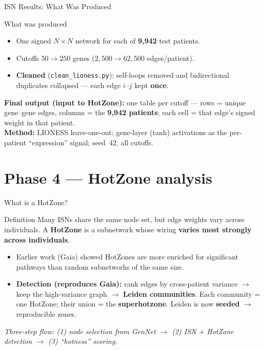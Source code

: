 \documentclass[aspectratio=169]{beamer}
\begin{document}
\begin{frame}{ISN Results: What Was Produced}
    \small
    \begin{block}{What was produced}
        \footnotesize
        \begin{itemize}
            \item One signed $N\times N$ network for each of \textbf{9{,}942} test patients.
            \item Cutoffs $50\to250$ genes ($2{,}500\to62{,}500$ edges/patient).
            \item \textbf{Cleaned} (\texttt{clean\_lioness.py}): self-loops removed and bidirectional
                  duplicates collapsed --- each edge $i$--$j$ kept \textbf{once}.
        \end{itemize}
    \end{block}
    \footnotesize
    \textbf{Final output (input to HotZone):} one table per cutoff --- rows = unique gene--gene edges,
    columns = the \textbf{9{,}942 patients}; each cell = that edge's signed weight in that patient.
    \vspace{0.15cm}
    \centering\scriptsize \\
    \textbf{Method:} LIONESS leave-one-out; gene-layer (tanh) activations as the per-patient
    ``expression'' signal; seed~42, all cutoffs.
\end{frame}

\section{Phase 4 — HotZone analysis}

\begin{frame}{What is a HotZone?}
    \small
    \begin{block}{Definition}
        Many ISNs share the same node set, but edge weights vary across individuals.
        A \textbf{HotZone} is a subnetwork whose wiring \textbf{varies most strongly across individuals}.
    \end{block}
    \begin{itemize}
        \item Earlier work (Gaia) showed HotZones are more enriched for significant pathways than random subnetworks of the same size.
        \item \textbf{Detection (reproduces Gaia):} rank edges by cross-patient variance $\rightarrow$
              keep the high-variance graph $\rightarrow$ \textbf{Leiden communities}.
              Each community = one HotZone; their union = the \textbf{superhotzone}.
              Leiden is now \textbf{seeded} $\rightarrow$ reproducible zones.
    \end{itemize}
    \centering\footnotesize
    \textit{Three-step flow: (1) node selection from GenNet $\rightarrow$ (2) ISN + HotZone detection $\rightarrow$ (3) ``hotness'' scoring.}
\end{frame}
\end{document}
